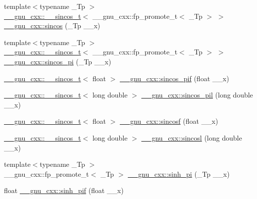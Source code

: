 \begin{DoxyCompactItemize}
\item 
{\footnotesize template$<$typename \+\_\+\+Tp $>$ }\\\hyperlink{struct____gnu__cxx_1_1____sincos__t}{\+\_\+\+\_\+gnu\+\_\+cxx\+::\+\_\+\+\_\+sincos\+\_\+t}$<$ \+\_\+\+\_\+gnu\+\_\+cxx\+::fp\+\_\+promote\+\_\+t$<$ \+\_\+\+Tp $>$ $>$ \hyperlink{group__mathsf__gnu_ga5d3a375ada451e0a9a78441ddfcf52a3}{\+\_\+\+\_\+gnu\+\_\+cxx\+::sincos} (\+\_\+\+Tp \+\_\+\+\_\+x)
\item 
{\footnotesize template$<$typename \+\_\+\+Tp $>$ }\\\hyperlink{struct____gnu__cxx_1_1____sincos__t}{\+\_\+\+\_\+gnu\+\_\+cxx\+::\+\_\+\+\_\+sincos\+\_\+t}$<$ \+\_\+\+\_\+gnu\+\_\+cxx\+::fp\+\_\+promote\+\_\+t$<$ \+\_\+\+Tp $>$ $>$ \hyperlink{group__mathsf__gnu_ga6553883f127ea0de67041c3128e03813}{\+\_\+\+\_\+gnu\+\_\+cxx\+::sincos\+\_\+pi} (\+\_\+\+Tp \+\_\+\+\_\+x)
\item 
\hyperlink{struct____gnu__cxx_1_1____sincos__t}{\+\_\+\+\_\+gnu\+\_\+cxx\+::\+\_\+\+\_\+sincos\+\_\+t}$<$ float $>$ \hyperlink{group__mathsf__gnu_gacf416c867a8a456f8f0e3d8b45ca8bd5}{\+\_\+\+\_\+gnu\+\_\+cxx\+::sincos\+\_\+pif} (float \+\_\+\+\_\+x)
\item 
\hyperlink{struct____gnu__cxx_1_1____sincos__t}{\+\_\+\+\_\+gnu\+\_\+cxx\+::\+\_\+\+\_\+sincos\+\_\+t}$<$ long double $>$ \hyperlink{group__mathsf__gnu_ga1f1efc07313a3de1e994d89c3b83b957}{\+\_\+\+\_\+gnu\+\_\+cxx\+::sincos\+\_\+pil} (long double \+\_\+\+\_\+x)
\item 
\hyperlink{struct____gnu__cxx_1_1____sincos__t}{\+\_\+\+\_\+gnu\+\_\+cxx\+::\+\_\+\+\_\+sincos\+\_\+t}$<$ float $>$ \hyperlink{group__mathsf__gnu_ga3929d13e38535418cd24db5cee80660c}{\+\_\+\+\_\+gnu\+\_\+cxx\+::sincosf} (float \+\_\+\+\_\+x)
\item 
\hyperlink{struct____gnu__cxx_1_1____sincos__t}{\+\_\+\+\_\+gnu\+\_\+cxx\+::\+\_\+\+\_\+sincos\+\_\+t}$<$ long double $>$ \hyperlink{group__mathsf__gnu_ga96a7222e47d430a228973658ca9f6f35}{\+\_\+\+\_\+gnu\+\_\+cxx\+::sincosl} (long double \+\_\+\+\_\+x)
\item 
{\footnotesize template$<$typename \+\_\+\+Tp $>$ }\\\+\_\+\+\_\+gnu\+\_\+cxx\+::fp\+\_\+promote\+\_\+t$<$ \+\_\+\+Tp $>$ \hyperlink{group__mathsf__gnu_gade43453b87b6b38c05b3fcce40870542}{\+\_\+\+\_\+gnu\+\_\+cxx\+::sinh\+\_\+pi} (\+\_\+\+Tp \+\_\+\+\_\+x)
\item 
float \hyperlink{group__mathsf__gnu_ga74103f57ab0d97126732f3cb276c5ab3}{\+\_\+\+\_\+gnu\+\_\+cxx\+::sinh\+\_\+pif} (float \+\_\+\+\_\+x)

\end{DoxyCompactItemize}
